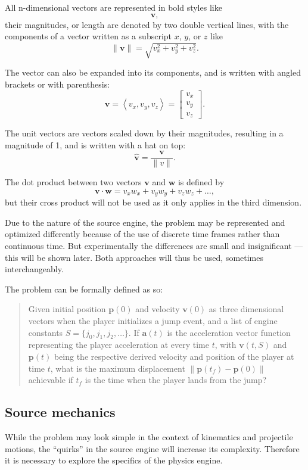 \documentclass[a4paper,11pt]{article}
\newcommand{\tvec}[1]{\boldsymbol{#1}}
\newcommand{\tunit}[1]{\boldsymbol{\hat{#1}}}
\newcommand{\tmag}[1]{\|#1\|}
\newcommand{\tang}[1]{\left\langle #1 \right\rangle}
\newcommand{\ta}{\tvec{a}}
\newcommand{\tv}{\tvec{v}}
\newcommand{\tp}{\tvec{p}}
\newcommand{\tpars}[3]{\begin{bmatrix} #1\\#2\\#3 \end{bmatrix}}
\begin{document}
All n-dimensional vectors are represented in bold styles like
\[
    \tvec{v},
\]
their magnitudes, or length are denoted by two double vertical lines, with the components of a vector written as a subscript $x$, $y$, or $z$ like
\[
    \tmag{\tvec{v}} = \sqrt{v_x^2 + v_y^2 + v_z^2}.
\]

The vector can also be expanded into its components, and is written with angled brackets or with parenthesis:
\[
    \tvec{v} = \tang{v_x, v_y, v_z} = \tpars{v_x}{v_y}{v_z}.
\]

The unit vectors are vectors scaled down by their magnitudes, resulting in a magnitude of 1, and is written with a hat on top:
\[
    \tunit{v} = \frac{\tvec{v}}{\tmag{v}}.
\]

The dot product between two vectors $\tvec{v}$ and $\tvec{w}$ is defined by
\[
    \tvec{v} \cdot \tvec{w} = v_x w_x + v_y w_y + v_z w_z + \ldots,
\]
but their cross product will not be used as it only applies in the third dimension.

Due to the nature of the source engine, the problem may be represented and optimized differently because of the use of discrete time frames rather than continuous time. But experimentally the differences are small and insignificant --- this will be shown later. Both approaches will thus be used, sometimes interchangeably.

The problem can be formally defined as so:
\begin{quote}
    Given initial position $\tvec{p}(0)$ and velocity $\tvec{v}(0)$ as three dimensional vectors when the player initializes a jump event, and a list of engine constants $S = \{j_0, j_1, j_2, \ldots\}$. If $\ta(t)$ is the acceleration vector function representing the player acceleration at every time $t$, with $\tv(t, S)$ and $\tp(t)$ being the respective derived velocity and position of the player at time $t$, what is the maximum displacement $\tmag{\tp(t_f) - \tp(0)}$ achievable if $t_f$ is the time when the player lands from the jump?
\end{quote}

\subsection{Source mechanics}
While the problem may look simple in the context of kinematics and projectile motions, the ``quirks'' in the source engine will increase its complexity. Therefore it is necessary to explore the specifics of the physics engine.
\end{document}
